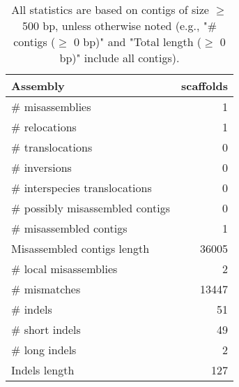\documentclass[12pt,a4paper]{article}
\begin{document}
\begin{table}[ht]
\begin{center}
\caption{All statistics are based on contigs of size $\geq$ 500 bp, unless otherwise noted (e.g., "\# contigs ($\geq$ 0 bp)" and "Total length ($\geq$ 0 bp)" include all contigs).}
\begin{tabular}{|l*{1}{|r}|}
\hline
Assembly & scaffolds \\ \hline
\# misassemblies & 1 \\ \hline
\hspace{5mm}\# relocations & 1 \\ \hline
\hspace{5mm}\# translocations & 0 \\ \hline
\hspace{5mm}\# inversions & 0 \\ \hline
\hspace{5mm}\# interspecies translocations & 0 \\ \hline
\# possibly misassembled contigs & 0 \\ \hline
\# misassembled contigs & 1 \\ \hline
Misassembled contigs length & 36005 \\ \hline
\# local misassemblies & 2 \\ \hline
\# mismatches & 13447 \\ \hline
\# indels & 51 \\ \hline
\hspace{5mm}\# short indels & 49 \\ \hline
\hspace{5mm}\# long indels & 2 \\ \hline
Indels length & 127 \\ \hline
\end{tabular}
\end{center}
\end{table}
\end{document}
